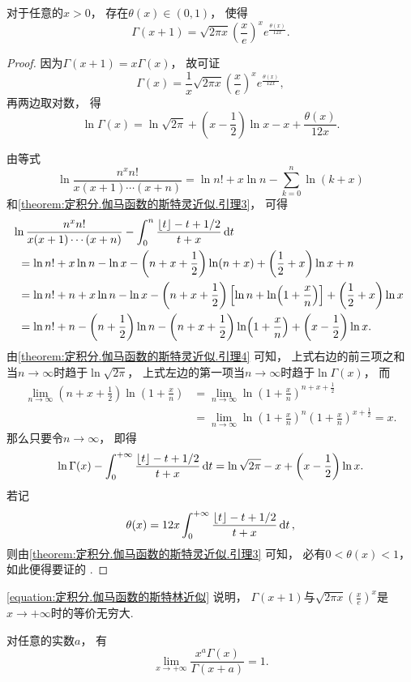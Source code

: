 \begin{theorem}
对于任意的\(x>0\)，
存在\(\theta(x)\in(0,1)\)，
使得\begin{equation}\label{equation:定积分.伽马函数的斯特林近似}
	\Gamma(x+1) = \sqrt{2\pi x}
		\left(\frac{x}{e}\right)^x e^{\frac{\theta(x)}{12x}}.
\end{equation}
\begin{proof}
因为\(\Gamma(x+1) = x \Gamma(x)\)，
故可证\[
	\Gamma(x) = \frac{1}{x} \sqrt{2\pi x} \left(\frac{x}{e}\right)^x e^{\frac{\theta(x)}{12x}},
\]
再两边取对数，
得\[
	\ln \Gamma(x) = \ln\sqrt{2\pi} + \left(x - \frac{1}{2}\right) \ln x - x + \frac{\theta(x)}{12x}.
\]

由等式\[
	\ln\frac{n^x n!}{x(x+1)\dotsm(x+n)}
	= \ln n! + x \ln n - \sum_{k=0}^n \ln(k+x)
\]
和\cref{theorem:定积分.伽马函数的斯特灵近似.引理3}，
可得\begin{align*}
	&\hspace{-5pt}
	\ln\frac{n^x n!}{x(x+1)\dotsm(x+n)}
	- \int_0^n \frac{\lfloor t\rfloor - t + 1/2}{t + x} \dd{t} \\
	&= \ln n! + x \ln n - \ln x - \left(n+x+\frac{1}{2}\right) \ln(n+x) + \left(\frac{1}{2}+x\right) \ln x + n \\
	&= \ln n! + n + x \ln n - \ln x
	- \left(n+x+\frac{1}{2}\right) \left[\ln n + \ln(1+\frac{x}{n})\right]
	+ \left(\frac{1}{2}+x\right) \ln x \\
	&= \ln n! + n - \left(n+\frac{1}{2}\right) \ln n
	- \left(n+x+\frac{1}{2}\right) \ln(1+\frac{x}{n})
	+ \left(x-\frac{1}{2}\right) \ln x.
\end{align*}
由\cref{theorem:定积分.伽马函数的斯特灵近似.引理4} 可知，
上式右边的前三项之和当\(n\to\infty\)时趋于\(\ln\sqrt{2\pi}\)，
上式左边的第一项当\(n\to\infty\)时趋于\(\ln\Gamma(x)\)，
而{\def\xn{\left(1+\frac{x}{n}\right)}%
\begin{align*}
	\lim_{n\to\infty} \left(n+x+\frac{1}{2}\right) \ln\xn
	&= \lim_{n\to\infty} \ln\xn^{n+x+\frac{1}{2}} \\
	&= \lim_{n\to\infty} \ln\xn^n \xn^{x+\frac{1}{2}}
	= x.
\end{align*}}
那么只要令\(n\to\infty\)，
即得\[
	\ln\Gamma(x) - \int_0^{+\infty} \frac{\lfloor t\rfloor - t + 1/2}{t + x} \dd{t}
	= \ln\sqrt{2\pi} - x + \left(x - \frac{1}{2}\right) \ln x.
\]
若记\[
	\theta(x) = 12 x \int_0^{+\infty} \frac{\lfloor t\rfloor - t + 1/2}{t + x} \dd{t},
\]
则由\cref{theorem:定积分.伽马函数的斯特灵近似.引理3} 可知，
必有\(0<\theta(x)<1\)，
如此便得要证的 .
\end{proof}
\end{theorem}
\begin{remark}
\cref{equation:定积分.伽马函数的斯特林近似} 说明，
\(\Gamma(x+1)\)与\(\sqrt{2\pi x} \left(\frac{x}{e}\right)^x\)是\(x\to+\infty\)时的等价无穷大.
\end{remark}

\begin{corollary}
对任意的实数\(a\)，
有\begin{equation}\label{equation:反常积分.伽马函数.极限1}
	\lim_{x\to+\infty} \frac{x^a \Gamma(x)}{\Gamma(x+a)} = 1.
\end{equation}
\end{corollary}
